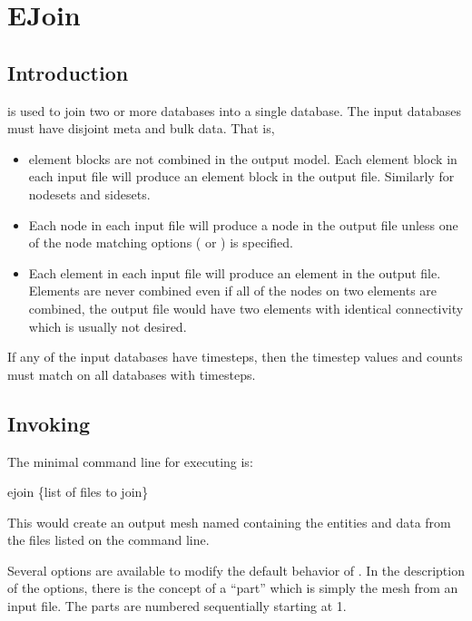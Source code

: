 \chapter{EJoin}\label{ch:ejoin}
\section{Introduction}
\ejoin{} is used to join two or more \exo{} databases into a single
\exo{} database. The input databases must have disjoint meta and bulk data.
That is, 
\begin{itemize}
\item element blocks are not combined in the output model.  Each
element block in each input file will produce an element block in the
output file. Similarly for nodesets and sidesets.
\item Each node in each input file will produce a node in the output
file unless one of the node matching options
( or ) is specified.
\item Each element in each input file will produce an element in the
output file. Elements are never combined even if all of the nodes on
two elements are combined, the output file would have two elements
with identical connectivity which is usually not desired.
\end{itemize}
If any of the input databases have timesteps, then the timestep values
and counts must match on all databases with timesteps.

\section{Invoking \ejoin}

The minimal command line for executing \ejoin{} is:
\begin{syntax}
     ejoin \{list of files to join\}
\end{syntax}
This would create an output mesh named  containing
the entities and data from the files listed on the command line. 

Several options are available to modify the default behavior of
\ejoin{}. In the description of the options, there is the concept of a
``part'' which is simply the mesh from an input file. The parts are
numbered sequentially starting at 1.

